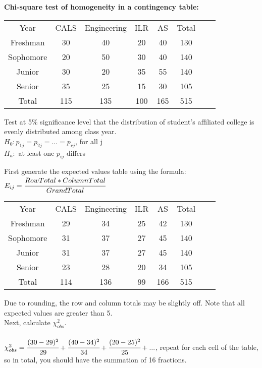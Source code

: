 \documentclass[12pt]{article}
\begin{document}
\noindent \textbf{Chi-square test of homogeneity in a contingency table:}\\

\begin{center}
\begin{tabular}{ c c c c c c c c}
 Year & CALS & Engineering & ILR & AS&Total\\ 
 Freshman & 30 & 40 &20 &40 &130 \\  
 Sophomore & 20 & 50 &30 &40&140 \\
 Junior & 30 & 20 &35 &55 &140 \\  
 Senior & 35 & 25 &15 &30 & 105 \\
 \hline
 Total &115 & 135 &100 & 165 &515
\end{tabular}
\end{center}

\noindent Test at 5\% significance level that the distribution of student's affiliated college is evenly distributed among class year. \\

\noindent $H_{0}: p_{1j}=p_{2j}=...=p_{rj}$, for all j\\

\noindent $H_{a}:$ at least one $p_{ij}$ differs

\noindent First generate the expected values table using the formula: $E_{ij} = \cfrac{RowTotal * ColumnTotal}{GrandTotal}$\\


\begin{center}
\begin{tabular}{ c c c c c c c c}
 Year & CALS & Engineering & ILR & AS&Total\\ 
 Freshman & 29 & 34 &25 &42 &130 \\  
 Sophomore & 31 & 37 &27 &45&140 \\
 Junior & 31 & 37 &27 &45 &140 \\  
 Senior & 23 & 28 &20 &34 & 105 \\
 \hline
 Total &114 & 136 &99 & 166 &515
\end{tabular}
\end{center}

\noindent Due to rounding, the row and column totals may be slightly off. Note that all expected values are greater than 5. \\

\noindent Next, calculate $\chi^{2}_{obs}$.\\
\\
$\chi^{2}_{obs} = \cfrac{(30-29)^{2}}{29}+\cfrac{(40-34)^{2}}{34}+\cfrac{(20-25)^{2}}{25}+...$, repeat for each cell of the table, so in total, you should have the summation of 16 fractions. \\
\end{document}

